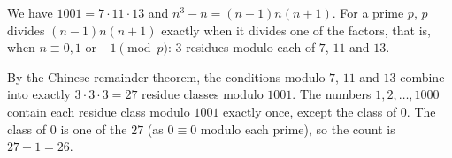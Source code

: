 We have $1001=7\cdot11\cdot13$ and $n^3-n=(n-1)n(n+1)$. For a prime $p$, $p$ divides $(n-1)n(n+1)$ exactly when it divides one of the factors, that is, when $n\equiv0,1$ or $-1\pmod p$: $3$ residues modulo each of $7$, $11$ and $13$.

By the Chinese remainder theorem, the conditions modulo $7$, $11$ and $13$ combine into exactly $3\cdot3\cdot3=27$ residue classes modulo $1001$. The numbers $1,2,\dots,1000$ contain each residue class modulo $1001$ exactly once, except the class of $0$. The class of $0$ is one of the $27$ (as $0\equiv0$ modulo each prime), so the count is $27-1=\boxed{26}$.
